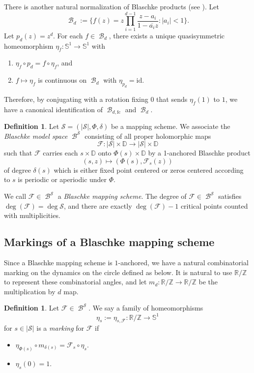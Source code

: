 \documentclass[11pt, reqno]{amsart}
\numberwithin{equation}{section}
\theoremstyle{plain}
\theoremstyle{theorem}
\theoremstyle{definition}
\newtheorem{defn}[theorem]{Definition}
\newcommand{\R}{\mathbb{R}}
\newcommand{\Z}{\mathbb{Z}}
\newcommand{\D}{\mathbb{D}}
\newcommand{\fc}{\text{fc}}
\newcommand{\bp}{\mathcal{F}}
\DeclareMathOperator{\BP}{\mathcal{B}}
\numberwithin{figure}{section}
\begin{document}
There is another natural normalization of Blaschke products (see \cite{McM09}). Let
$$
\BP_d:=\{f(z) = z\prod_{i=1}^{d-1} \frac{z-a_i}{1-\overline{a_i}z}: |a_i| < 1\}.
$$
Let $p_d(z) = z^d$.
For each $f\in \BP_d$, there exists a unique quasisymmetric homeomorphism $\eta_f:\mathbb{S}^1 \longrightarrow \mathbb{S}^1$ with
\begin{enumerate}
\item $\eta_f \circ p_{d} = f \circ \eta_f$, and
\item $f\mapsto \eta_f$ is continuous on $\BP_d$ with $\eta_{p_d} = \mathrm{id}$.
\end{enumerate}
Therefore, by conjugating with a rotation fixing $0$ that sends $\eta_f(1)$ to $1$, we have a canonical identification of $\BP_{d, \fc}$ and $\BP_d$.

\begin{defn}
Let $\mathcal{S}=(|\mathcal{S}|, \Phi, \delta)$ be a mapping scheme. 
We associate the {\em Blaschke model space} $\BP^\mathcal{S}$ consisting of all proper holomorphic maps
$$
\bp: |\mathcal{S}| \times \D \longrightarrow |\mathcal{S}| \times \D
$$
such that $\mathcal{F}$ carries each $s\times \D$ onto $\Phi(s) \times \D$ by a 1-anchored Blaschke product 
$$
(s, z) \mapsto (\Phi(s), \bp_s(z))
$$
of degree $\delta(s)$ which is either fixed point centered or zeros centered according to $s$ is periodic or aperiodic under $\Phi$.
\end{defn}
We call $\mathcal{F} \in \BP^\mathcal{S}$ a {\em Blaschke mapping scheme}.
The degree of $\bp \in \BP^\mathcal{S}$ satisfies
$\deg (\bp) = \deg \mathcal{S}$, and there are exactly $\deg(\bp)-1$ critical points counted with multiplicities.

\subsection*{Markings of a Blaschke mapping scheme}
Since a Blaschke mapping scheme is $1$-anchored, we have a natural combinatorial marking on the dynamics on the circle defined as below.
It is natural to use $\R/\Z$ to represent these combinatorial angles, and let $m_d: \R/\Z \longrightarrow \R/\Z$ be the multiplication by $d$ map.

\begin{defn}
Let $\bp\in \BP^\mathcal{S}$. We say a family of homeomorphisms 
$$
\eta_s := \eta_{s, \bp}: \R/\Z \longrightarrow \mathbb{S}^1
$$
for $s\in |\mathcal{S}|$ is a {\em marking} for $\bp$ if
\begin{itemize}
\item $\eta_{\Phi(s)} \circ m_{\delta(s)} = \bp_s \circ \eta_s$.
\item $\eta_s(0) = 1$.
\end{itemize}
\end{defn}
\end{document}
